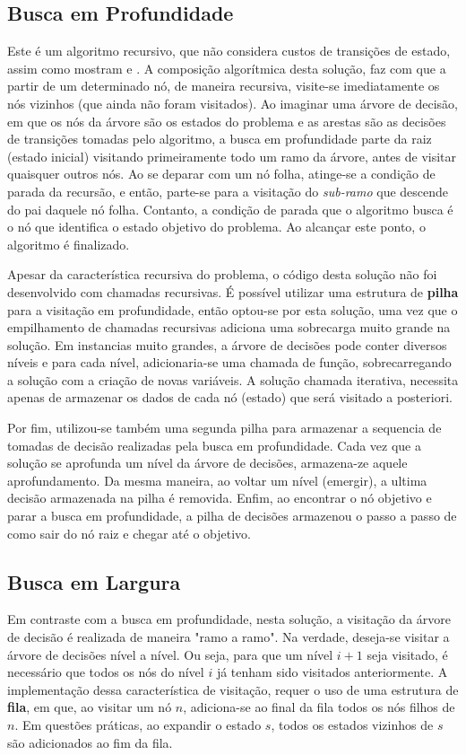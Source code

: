 \documentclass[12pt]{article}
\begin{document}
\subsection{Busca em Profundidade}
Este é um algoritmo recursivo, que não considera custos de transições de
estado, assim como mostram \cite{stuart:00} e \cite{cormen:01}.
A composição algorítmica desta solução, faz com que a partir de um determinado
nó, de maneira recursiva, visite-se imediatamente os nós vizinhos (que ainda
não foram visitados).
Ao imaginar uma árvore de decisão, em que os nós da árvore são os estados do
problema e as arestas são as decisões de transições tomadas pelo algoritmo,
a busca em profundidade parte da raiz (estado inicial) visitando primeiramente
todo um ramo da árvore, antes de visitar quaisquer outros nós.
Ao se deparar com um nó folha, atinge-se a condição de parada da recursão,
e então, parte-se para a visitação do \textit{sub-ramo} que descende do pai
daquele nó folha.
Contanto, a condição de parada que o algoritmo busca é o nó que identifica
o estado objetivo do problema.
Ao alcançar este ponto, o algoritmo é finalizado.

Apesar da característica recursiva do problema, o código desta solução não
foi desenvolvido com chamadas recursivas.
É possível utilizar uma estrutura de \textbf{pilha} para a visitação em
profundidade, então optou-se por esta solução, uma vez que o empilhamento
de chamadas recursivas adiciona uma sobrecarga muito grande na solução.
Em instancias muito grandes, a árvore de decisões pode conter diversos níveis
e para cada nível, adicionaria-se uma chamada de função, sobrecarregando
a solução com a criação de novas variáveis.
A solução chamada iterativa, necessita apenas de armazenar os dados de cada
nó (estado) que será visitado a posteriori.

Por fim, utilizou-se também uma segunda pilha para armazenar a sequencia de
tomadas de decisão realizadas pela busca em profundidade.
Cada vez que a solução se aprofunda um nível da árvore de decisões, armazena-ze
aquele aprofundamento.
Da mesma maneira, ao voltar um nível (emergir), a ultima decisão armazenada
na pilha é removida.
Enfim, ao encontrar o nó objetivo e parar a busca em profundidade, a pilha
de decisões armazenou o passo a passo de como sair do nó raiz e chegar até
o objetivo.

\subsection{Busca em Largura}
Em contraste com a busca em profundidade, nesta solução, a visitação
da árvore de decisão é realizada de maneira "ramo a ramo".
Na verdade, deseja-se visitar a árvore de decisões nível a nível.
Ou seja, para que um nível $i+1$ seja visitado, é necessário que todos
os nós do nível $i$ já tenham sido visitados anteriormente.
A implementação dessa característica de visitação, requer o uso de uma
estrutura de \textbf{fila}, em que, ao visitar um nó $n$, adiciona-se
ao final da fila todos os nós filhos de $n$.
Em questões práticas, ao expandir o estado $s$, todos os estados vizinhos
de $s$ são adicionados ao fim da fila.
\end{document}
